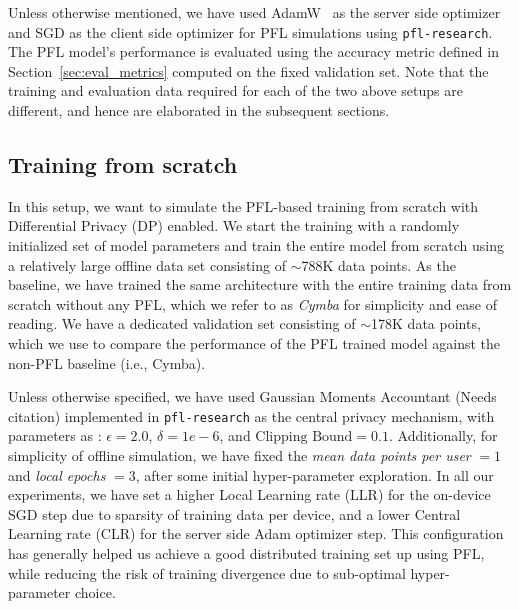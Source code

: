 Unless otherwise mentioned, we have used AdamW~\cite{loshchilov2017decoupled} as the server side optimizer and SGD as the client side optimizer for PFL simulations using \texttt{pfl-research}. 
The PFL model’s performance is evaluated using the accuracy metric defined in Section~\ref{sec:eval_metrics} computed on the fixed validation set.
Note that the training and evaluation data required for each of the two above setups are different, and hence are elaborated in the subsequent sections.

\subsection{Training from scratch}
\label{sec:scratch_train}

In this setup, we want to simulate the PFL-based training from scratch with Differential Privacy (DP) enabled. 
We start the training with a randomly initialized set of model parameters and train the entire model from scratch using a relatively large offline data set consisting of $\sim$788K data points. 
As the baseline, we have trained the same architecture with the entire training data from scratch without any PFL, which we refer to as \textit{Cymba} for simplicity and ease of reading.
We have a dedicated validation set consisting of $\sim$178K data points, which we use to compare the performance of the PFL trained model against the non-PFL baseline (i.e., Cymba).

Unless otherwise specified, we have used Gaussian Moments Accountant (Needs citation) implemented in \texttt{pfl-research} as the central privacy mechanism, with parameters as : $\epsilon = 2.0$, $\delta = 1e-6$, and $\text{Clipping Bound} = 0.1$. 
Additionally, for simplicity of offline simulation, we have fixed the \textit{mean data points per user} $= 1$ and \textit{local epochs} $= 3$, after some initial hyper-parameter exploration.
In all our experiments, we have set a higher Local Learning rate (LLR) for the on-device SGD step due to sparsity of training data per device, and a lower Central Learning rate (CLR) for the server side Adam optimizer step. This configuration has generally helped us achieve a good distributed training set up using PFL, while reducing the risk of training divergence due to sub-optimal hyper-parameter choice.

